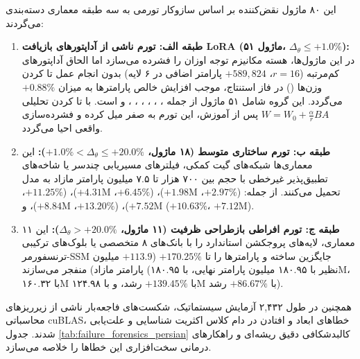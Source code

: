 این ۸۰ ماژول نقض‌کننده بر اساس سازوکار تورمی به سه طبقه معماری دسته‌بندی می‌گردند:
\begin{enumerate}
    \item \textbf{طبقه الف: تورم ناشی از آداپتورهای بازیافت LoRA (۵۱ ماژول، $\Delta_\theta \le +1.0\%$):} 
    در این ماژول‌ها، هسته مکانیزم توجه اوزان را فشرده می‌سازد اما الحاق آداپتورهای کم‌مرتبه  ($r=16$، $+589,824$ پارامتر اضافی در ۶ لایه) بدون انجام عمل تا کردن وزن‌ها () در فاز استنتاج، موجب افزایش خالص پارامترها به میزان $+0.88\%$ می‌گردد. این گروه شامل ۵۱ ماژول از جمله ، ، ، ، ، ،  و  است. با تا کردن تحلیلی $W = W_0 + \frac{\alpha}{r} B A$ پس از آموزش، این تورم به صفر میل کرده و فشرده‌سازی واقعی احیا می‌گردد.
    
    \item \textbf{طبقه ب: تورم ساختاری متوسط (۱۸ ماژول، $+1.0\% < \Delta_\theta \le +20.0\%$):}
    این معماری‌ها شبکه‌های گیت کمکی، فیلترهای مسیریابی چندسر یا شاخه‌های تطبیق‌پذیر غیرخطی با حجم بین ۷۰۰ هزار تا ۷.۵ میلیون پارامتر مازاد به مدل تحمیل می‌کنند. از جمله:  ($+2.97\%$، $+1.98\text{M}$)،  ($+6.45\%$، $+4.31\text{M}$)،  ($+11.25\%$، $+7.52\text{M}$)،  ($+13.20\%$، $+8.84\text{M}$)، و  ($+10.63\%$، $+7.12\text{M}$).
    
    \item \textbf{طبقه ج: تورم افراطی بازطراحی ظرفیت (۱۱ ماژول، $\Delta_\theta > +20.0\%$):}
    این ۱۱ معماری، لایه‌های پروجکشن استاندارد را با بانک‌های ۸ متخصصی  یا بلوک‌های ترکیبی ترنسفورمر-SSM جایگزین ساخته و پارامترها را تا $+170.25\%$ ($+113.9$ میلیون پارامتر مازاد) منفجر می‌سازند (نظیر  با ۱۸۰.۹۵ میلیون پارامتر نهایی،  با ۱۸۰.۹۵M،  با ۱۶۰.۳۲M با $+139.45\%$ رشد، و  با ۱۲۴.۹۸M با $+86.67\%$ رشد).
\end{enumerate}

همچنین در طول ۲,۴۳۲ آزمایش سیستماتیک، شکست‌های فاجعه‌بار ناشی از زیرریزهای محاسباتی cuBLAS، خطاهای ابعاد و افتادن در دام کلاس اکثریت شناسایی و علت‌یابی شدند. جدول \ref{tab:failure_forensics_persian} کالبدشکافی دقیق ریشه‌ای و راهکارهای درمانی سخت‌افزاری این خطاها را خلاصه می‌سازد.

